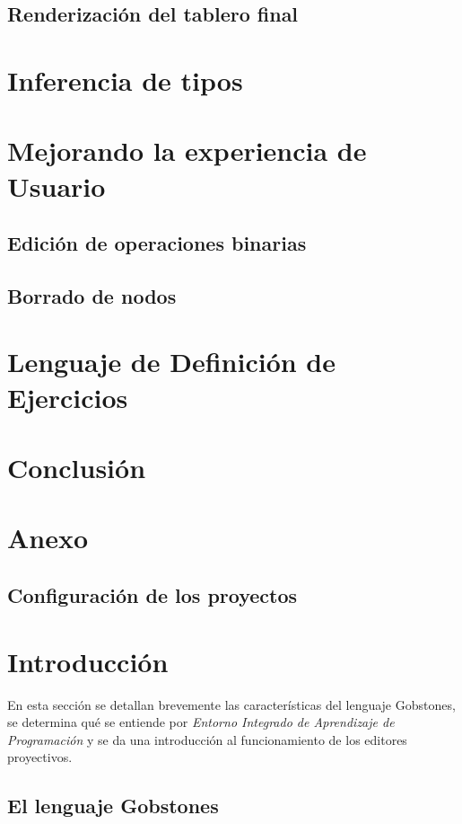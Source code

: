\subsection{Renderización del tablero final}

\section{Inferencia de tipos}

\section{Mejorando la experiencia de Usuario}

\subsection{Edición de operaciones binarias}
\subsection{Borrado de nodos}

\section{Lenguaje de Definición de Ejercicios}

\section{Conclusión}

\section{Anexo}
\subsection{Configuración de los proyectos}


\section{Introducción}

En esta sección se detallan brevemente las características del lenguaje Gobstones, se determina qué se entiende por \textit{Entorno Integrado de Aprendizaje de Programación} y se da una introducción al funcionamiento de los editores proyectivos.


\subsection{El lenguaje Gobstones}

